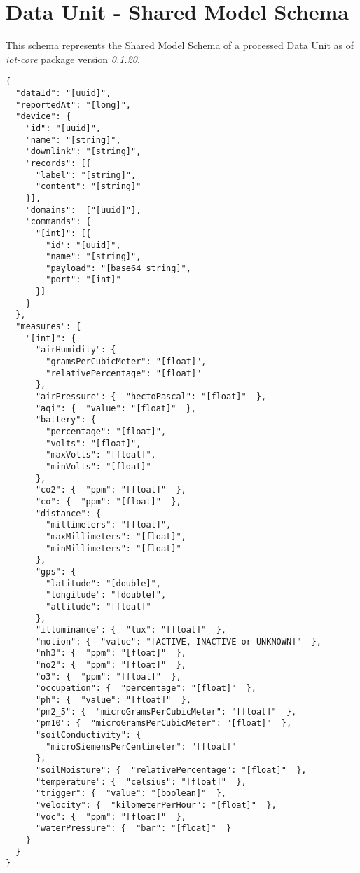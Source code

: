 \chapter{Data Unit - Shared Model Schema}
\label{AppendixA}

This schema represents the Shared Model Schema of a processed Data Unit as of \textit{iot-core} package version \textit{0.1.20}.

\begin{lstlisting}[style=json, caption=Data Unit - Shared Model Schema, label={code:AppendixA:schema}]
{
  "dataId": "[uuid]",
  "reportedAt": "[long]",
  "device": {
    "id": "[uuid]",
    "name": "[string]",
    "downlink": "[string]",
    "records": [{
      "label": "[string]",
      "content": "[string]"
    }],
    "domains":  ["[uuid]"],
    "commands": {
      "[int]": [{
        "id": "[uuid]",
        "name": "[string]",
        "payload": "[base64 string]",
        "port": "[int]"
      }]
    }
  },
  "measures": {
    "[int]": {
      "airHumidity": {
        "gramsPerCubicMeter": "[float]",
        "relativePercentage": "[float]"
      },
      "airPressure": {  "hectoPascal": "[float]"  },
      "aqi": {  "value": "[float]"  },
      "battery": {
        "percentage": "[float]",
        "volts": "[float]",
        "maxVolts": "[float]",
        "minVolts": "[float]"
      },
      "co2": {  "ppm": "[float]"  },
      "co": {  "ppm": "[float]"  },
      "distance": {
        "millimeters": "[float]",
        "maxMillimeters": "[float]",
        "minMillimeters": "[float]"
      },
      "gps": {
        "latitude": "[double]",
        "longitude": "[double]",
        "altitude": "[float]"
      },
      "illuminance": {  "lux": "[float]"  },
      "motion": {  "value": "[ACTIVE, INACTIVE or UNKNOWN]"  },
      "nh3": {  "ppm": "[float]"  },
      "no2": {  "ppm": "[float]"  },
      "o3": {  "ppm": "[float]"  },
      "occupation": {  "percentage": "[float]"  },
      "ph": {  "value": "[float]"  },
      "pm2_5": {  "microGramsPerCubicMeter": "[float]"  },
      "pm10": {  "microGramsPerCubicMeter": "[float]"  },
      "soilConductivity": {  
        "microSiemensPerCentimeter": "[float]"
      },
      "soilMoisture": {  "relativePercentage": "[float]"  },
      "temperature": {  "celsius": "[float]"  },
      "trigger": {  "value": "[boolean]"  },
      "velocity": {  "kilometerPerHour": "[float]"  },
      "voc": {  "ppm": "[float]"  },
      "waterPressure": {  "bar": "[float]"  }
    }
  }
}
\end{lstlisting}
